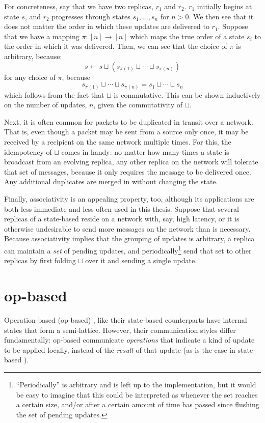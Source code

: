 For concreteness, say that we have two replicas, $r_1$ and $r_2$. $r_1$
initially begins at state $s$, and $r_2$ progresses through states $s_1, \ldots,
s_n$ for $n > 0$. We then see that it does not matter the order in which these
updates are delivered to $r_1$. Suppose that we have a mapping $\pi : [n] \to
[n]$ which maps the true order of a state $s_i$ to the order in which it was
delivered. Then, we can see that the choice of $\pi$ is arbitrary, because:
\[
  s \gets s \sqcup (s_{\pi(1)} \sqcup \cdots \sqcup s_{\pi(n)})
\]
for any choice of $\pi$, because
\[
  s_{\pi(1)} \sqcup \cdots \sqcup s_{\pi(n)} = s_1 \sqcup \cdots \sqcup s_n
\]
which follows from the fact that $\sqcup$ is commutative. This can be shown
inductively on the number of updates, $n$, given the commutativity of $\sqcup$.

Next, it is often common for packets to be duplicated in transit over a network.
That is, even though a packet may be sent from a source only once, it may be
received by a recipient on the same network multiple times. For this, the
idempotency of $\sqcup$ comes in handy: no matter how many times a state is
broadcast from an evolving replica, any other replica on the network will
tolerate that set of messages, because it only requires the message to be
delivered once. Any additional duplicates are merged in without changing the
state.

Finally, associativity is an appealing property, too, although its applications
are both less immediate and less often-used in this thesis. Suppose that several
replicas of a state-based \CRDT reside on a network with, say, high latency, or
it is otherwise undesirable to send more messages on the network than is
necessary. Because associativity implies that the grouping of updates is
arbitrary, a replica can maintain a \textit{set} of pending updates, and
periodically\footnote{``Periodically'' is arbitrary and is left up to the
implementation, but it would be easy to imagine that this could be interpreted
as whenever the set reaches a certain size, and/or after a certain amount of
time has passed since flushing the set of pending updates.} send that set to
other replicas by first folding $\sqcup$ over it and sending a single update.

\section{op-based \CRDTs}
\label{sec:op-based-crdts}

Operation-based (op-based) \CRDTs, like their state-based counterparts have
internal states that form a semi-lattice. However, their communication styles
differ fundamentally: op-based \CRDTs communicate \textit{operations} that
indicate a kind of update to be applied locally, instead of the \textit{result}
of that update (as is the case in state-based \CRDTs).

